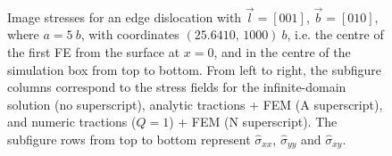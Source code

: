\documentclass[11pt]{iopart}
\begin{document}
\begin{figure}
    \hspace*{0.3cm}~
    ~
    ~

    \caption{Image stresses for an edge dislocation with $\vec{l} = [0 0 1]$, $\vec{b} = [0 1 0]$, where $a = 5~b$, with coordinates $(25.6410,\, 1000)~b$, i.e. the centre of the first FE from the surface at $x=0$, and in the centre of the simulation box from top to bottom. From left to right, the subfigure columns correspond to the stress fields for the infinite-domain solution (no superscript), analytic tractions + FEM (A superscript), and numeric tractions ($Q = 1$) + FEM (N superscript). The subfigure rows from top to bottom represent $\hat{\sigma}_{xx}$, $\hat{\sigma}_{yy}$ and $\hat{\sigma}_{xy}$.}
    \label{f:head_vs_ana_vs_num_epar}
\end{figure}
\end{document}
